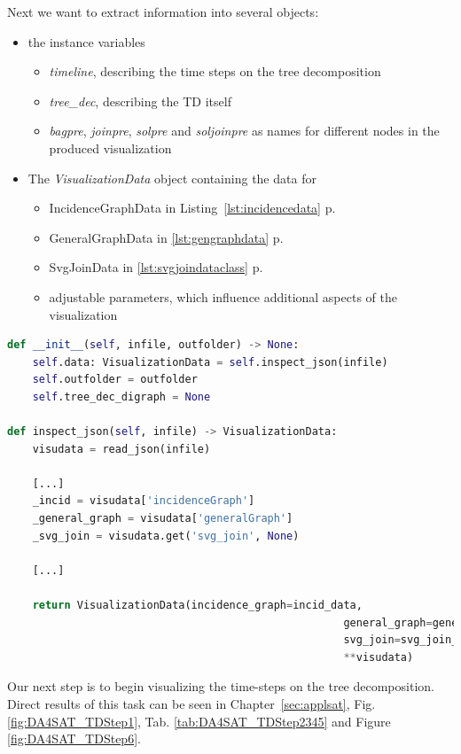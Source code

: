 \documentclass[a4paper, 12pt, bibliography=totoc]{scrartcl}
\begin{document}

Next we want to extract information into several objects: 
\begin{itemize}
	\item the instance variables 
	\begin{itemize}
		\item \textit{timeline}, describing the time steps on the tree decomposition
		\item \textit{tree\_dec}, describing the TD itself
		\item \textit{bagpre}, \textit{joinpre}, \textit{solpre} and \textit{soljoinpre} as names for different nodes in the produced visualization
	\end{itemize}
	\item The \textit{VisualizationData} object containing the data for 
	\begin{itemize}
		\item IncidenceGraphData in Listing~\ref{lst:incidencedata} p.~\pageref{lst:incidencedata}
		\item GeneralGraphData in \ref{lst:gengraphdata} p.~\pageref{lst:gengraphdata}
		\item SvgJoinData in \ref{lst:svgjoindataclass} p.~\pageref{lst:svgjoindataclass}
		\item adjustable parameters, which influence additional aspects of the visualization
	\end{itemize}
\end{itemize}


\begin{lstlisting}[language={Python}, caption={Overview of data initialization}, label={lst:visuinitsmall}]
def __init__(self, infile, outfolder) -> None:
	self.data: VisualizationData = self.inspect_json(infile)
	self.outfolder = outfolder
	self.tree_dec_digraph = None
	
def inspect_json(self, infile) -> VisualizationData:
	visudata = read_json(infile)
	
	[...]
	_incid = visudata['incidenceGraph']
	_general_graph = visudata['generalGraph']
	_svg_join = visudata.get('svg_join', None)
	
	[...]
		
	return VisualizationData(incidence_graph=incid_data,
													 general_graph=general_graph_data,
													 svg_join=svg_join_data,
													 **visudata)
\end{lstlisting}


Our next step is to begin visualizing the time-steps on the tree decomposition. Direct results of this task can be seen in Chapter~\ref{sec:applsat}, Fig. \ref{fig:DA4SAT_TDStep1}, Tab. \ref{tab:DA4SAT_TDStep2345} and Figure \ref{fig:DA4SAT_TDStep6}.\\
\end{document}
